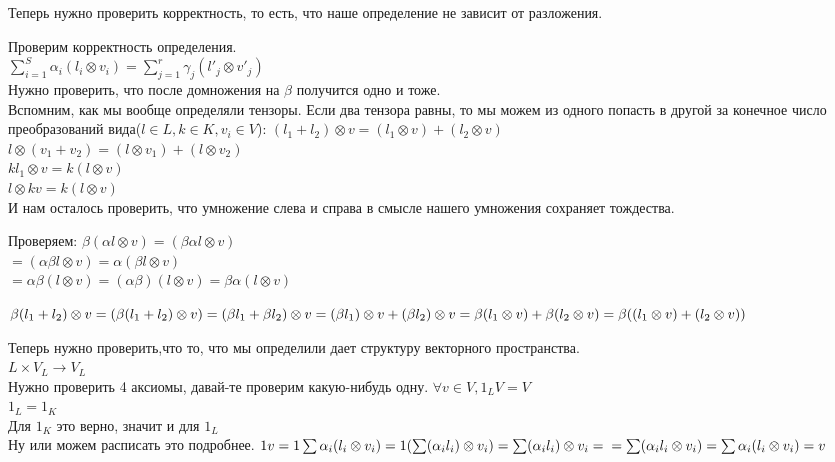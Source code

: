 \begin{description}
Теперь нужно проверить корректность, то есть, 
что наше определение не зависит от разложения.

Проверим корректность определения.\\
$\sum_{i = 1}^{S}\alpha_i(l_i \otimes v_i) = \sum_{j = 1}^{r}\gamma_j(l'_j \otimes v'_j)$\\
Нужно проверить, что после домножения на $\beta$ получится одно и тоже.\\

Вспомним, как мы вообще определяли тензоры. Если два тензора равны, то мы можем из 
одного попасть в другой за конечное число преобразований вида($l \in L, k \in K, v_i \in V$):
$(l_1 + l_2)\otimes v = (l_1 \otimes v) + (l_2\otimes v)$ \\
$l\otimes(v_1 + v_2) = (l\otimes v_1) + (l \otimes v_2)$ \\
$kl_1 \otimes v =  k(l\otimes v)$\\ 
$l\otimes kv = k(l\otimes v)$\\

И нам осталось проверить, что умножение слева и справа в смысле нашего умножения
сохраняет тождества.

Проверяем:
$\beta(\alpha l \otimes v) = (\beta \alpha l \otimes v)$\\
$= (\alpha \beta l \otimes v) = \alpha (\beta l \otimes v)$\\
$= \alpha \beta(l \otimes v) = (\alpha \beta)(l \otimes v) = \beta \alpha (l \otimes v)$

$\beta(l_1 + l_2)\otimes v = (\beta(l_1 + l_2) \otimes v) = (\beta l_1 + \beta l_2)\otimes v = \\
(\beta l_1) \otimes v + (\beta l_2) \otimes v = \beta(l_1 \otimes v)+ \beta(l_2 \otimes v) = \beta((l_1 \otimes v) + (l_2 \otimes v))$                                       

Теперь нужно проверить,что то, что мы определили дает структуру векторного пространства.\\ 
$L \times V_L \to V_L$\\
Нужно проверить 4 аксиомы, давай-те проверим какую-нибудь одну. 
$\forall v \in V, 1_L V = V$\\
$1_L = 1_K$\\
Для $1_K$ это верно, значит и для $1_L$\\

Ну или можем расписать это подробнее.
$1v = 1\sum \alpha_i(l_i \otimes v_i) = \\
1(\sum (\alpha_i l_i) \otimes v_i) = \sum(\alpha_i l_i)\otimes v_i  =\\
= \sum(\alpha_i l_i \otimes v_i) = \sum \alpha_i(l_i \otimes v_i) = v$



\end{description}
